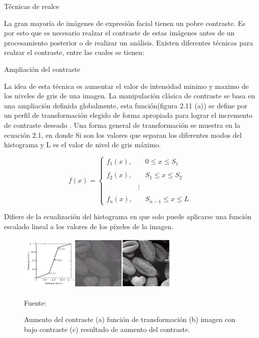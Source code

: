 \begin{enumerate}
{\bf\item[A. ] Técnicas de realce} \vskip 0.1cm
La gran mayoría de imágenes de expresión facial tienen un pobre contraste. Es por esto que es necesario realzar el contraste de estas imágenes antes de un procesamiento posterior o de realizar un análisis. Existen diferentes técnicas para realzar el contraste, entre las cuales se tienen:

\begin{itemize}
{\bf \item[•] Ampliación del contraste} \vskip 0.1cm
La idea de esta técnica es aumentar el valor de intensidad minimo y maximo de los niveles de gris de una imagen. La manipulación clásica de contraste se basa en una ampliación definida globalmente, esta función(figura 2.11 (a)) se define por un perfil de transformación elegido de forma apropiada para lograr el incremento de contraste deseado \citep{Zeyun}. 
\vskip 0.1cm
Una forma general de transformación se muestra en la ecuación 2.1, en donde Si son los valores que separan los diferentes modos del histograma y L es el valor de nivel de gris máximo. 

\begin{equation}
f(x)= \left\{ \begin{array}{lcc}
             f_{1}(x), & & 0 \leqslant x \leqslant S_{1}  \\
             \\ f_{2}(x), & & S_{1} \leqslant x \leqslant S_{2} \\
             \\ & \vdots & \\
             \\ f_{n}(x), & & S_{n-1} \leqslant x \leqslant L 
             \end{array}
   \right.
\end{equation}

\vskip 0.1cm 
Difiere de la ecualización del histograma en que solo puede aplicarse una función escalado lineal a los valores de los píxeles de la imagen.

\begin{figure}[ht]
\begin{center}
\includegraphics[width=0.7\textwidth]{Imagen12}
\end{center}
\begin{center}
\vskip -0.5cm
\caption{\small{Aumento del contraste (a) función de transformación (b) imagen con bajo contraste (c) resultado de aumento del contraste.}}
{\small{Fuente: \cite{Zeyun}}}
\end{center}
\end{figure}


\end{itemize}
\end{enumerate}
